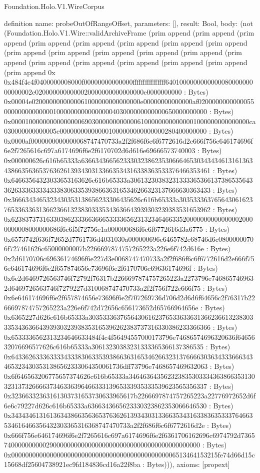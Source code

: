 \begin{lexlean}{Foundation.Holo.V1.WireCorpus}
\begin{semanticmodule}
definition{
  name: probeOutOfRangeOffset,
  parameters: [],
  result: Bool,
  body: (not (Foundation.Holo.V1.Wire::validArchiveFrame (prim append (prim append (prim append (prim append (prim append (prim append (prim append (prim append (prim append (prim append (prim append (prim append (prim append (prim append (prim append (prim append (prim append (prim append (prim append (prim append 0x 0x484f4c4f0400000008000f00000000000000ffffffffffffffff640100000000000008000000000000002e0200000000000020000000000000000e0000000000 : Bytes) 0x00004e0200000000000061000000000000000e00000000000000af02000000000000550000000000000010000000000000000403000000000000650000000000 : Bytes) 0x00001000000000000000690300000000000061000000000000001000000000000000ca030000000000005e000000000000001000000000000000280400000000 : Bytes) 0x0000af0000000000000068747470733a2f2f686f6c6f6772616d2e666f756e646174696f6e2f7265616c697a6174696f6e2f6170702d6d616e69666573740003 : Bytes) 0x000000626c616b65333a636634366562333032386235306664653034343461316136343866356365376362613934303133663534316338363533376466353461 : Bytes) 0x64663564323033653163626c616b65333a3061323038323133336536613738653564336263336333343338306335393866363165346266323137666630363433 : Bytes) 0x3666343465323430353138656233306435626c616b65333a30353336376564306162376533633631366236613238303335343636643939303239383531653962 : Bytes) 0x6238373731633038623336636665333365623132346466335200000000000000020000000008000000686f6c6f5f72756e1a000000686f6c6f6772616d3a6775 : Bytes) 0x6573742f636f72652d7761736d4031030a000000696e6465782e68746d6c08000000706f727461626c65000000007b2266697874757265223a226e6f742d616e : Bytes) 0x2d6170706c69636174696f6e227d3e0068747470733a2f2f686f6c6f6772616d2e666f756e646174696f6e2f657874656e73696f6e2f6170706c69636174696f : Bytes) 0x6e2d6469726563746f72792f76317b2266697874757265223a2273796e7468657469632d6469726563746f7279227d310068747470733a2f2f756f722e666f75 : Bytes) 0x6e646174696f6e2f657874656e73696f6e2f707269736d706d2d6d6f64656c2f76317b2266697874757265223a226e6f742d72656c656173652d65766964656e : Bytes) 0x6365227d626c616b65333a3035333637656430616237653363363136623661323830333534363664393930323938353165396262383737316330386233366366 : Bytes) 0x6533336562313234646633484f4c4f56494557000173796e74686574696320636f6465632076696577626c616b65333a30613230383231333365366137386535 : Bytes) 0x6433626333633334333830633539386636316534626632313766663036343336663434653234303531386562333064350061736dff73796e7468657469632063 : Bytes) 0x6f646563206775657374626c616b65333a3464636435623238353033343638663531303231373266663734633639646633313965333935333539623565356337 : Bytes) 0x32366332363161303731653730633965617b2266697874757265223a22776972652d6f6e6c79227d626c616b65333a6366343665623330323862353066646530 : Bytes) 0x343434613161363438663563653763626139343031336635343163383635333764663534616466356432303365316368747470733a2f2f686f6c6f6772616d2e : Bytes) 0x666f756e646174696f6e2f7265616c697a6174696f6e2f6361706162696c6974792d736574000000000029000000000000000000000000000000000000000000 : Bytes) 0x00000000000000000000000000000000000000000000006513464153215fe74d66d15c15668df25604738921ec9fd184836cd16a22f8ba : Bytes))),
  axioms: [propext]
}


\end{semanticmodule}
\end{lexlean}
